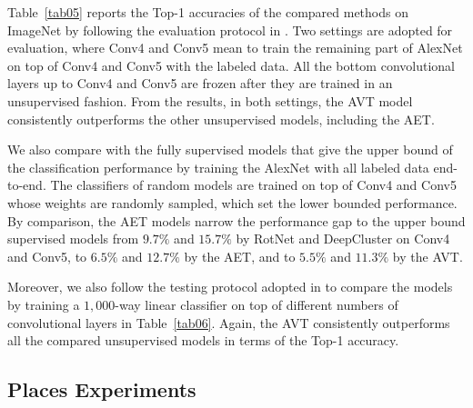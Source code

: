 \documentclass[10pt,journal,compsoc,twoside]{IEEEtran}
\begin{document}
Table~\ref{tab05} reports the Top-1 accuracies of the compared methods on ImageNet by following the evaluation protocol in \cite{noroozi2016unsupervised}. Two settings are adopted for evaluation, where Conv4 and Conv5 mean to train the remaining part of AlexNet on top of Conv4 and Conv5 with the labeled data. All the bottom convolutional layers up to Conv4 and Conv5 are frozen after they are trained in an unsupervised fashion. %
From the results, in both settings, the AVT model consistently outperforms the other unsupervised models, including the AET.

We also compare with the fully supervised models that give the upper bound of the classification performance by training the AlexNet with all labeled data end-to-end. The classifiers of random models are trained on top of Conv4 and Conv5 whose weights are randomly sampled, which set the lower bounded performance. By comparison, the AET models narrow the performance gap to the upper bound supervised models from $9.7\%$ and $15.7\%$ by RotNet and DeepCluster on Conv4 and Conv5, to $6.5\%$ and $12.7\%$ by the AET, and to $5.5\%$ and $11.3\%$ by the AVT.


Moreover, we also follow the testing protocol adopted in \cite{zhang2017split} to compare the models by training a $1,000$-way linear classifier on top of different numbers of convolutional layers in Table~\ref{tab06}.  Again, the AVT consistently outperforms all the compared unsupervised models in terms of the Top-1 accuracy.

\subsection{Places Experiments}
\end{document}

